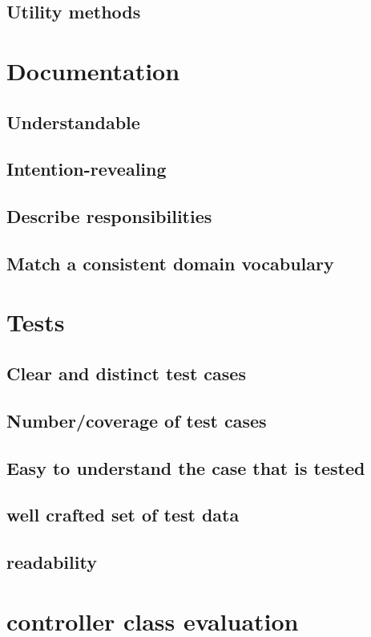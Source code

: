 \documentclass[a4wide]{article}
\begin{document}
\subsection{Utility methods}
\section{Documentation}
\subsection{Understandable}
\subsection{Intention-revealing}
\subsection{Describe responsibilities}
\subsection{Match a consistent domain vocabulary}
\section{Tests}
\subsection{Clear and distinct test cases}
\subsection{Number/coverage of test cases}
\subsection{Easy to understand the case that is tested}
\subsection{well crafted set of test data}
\subsection{readability}
\section{controller class evaluation}
\end{document}
